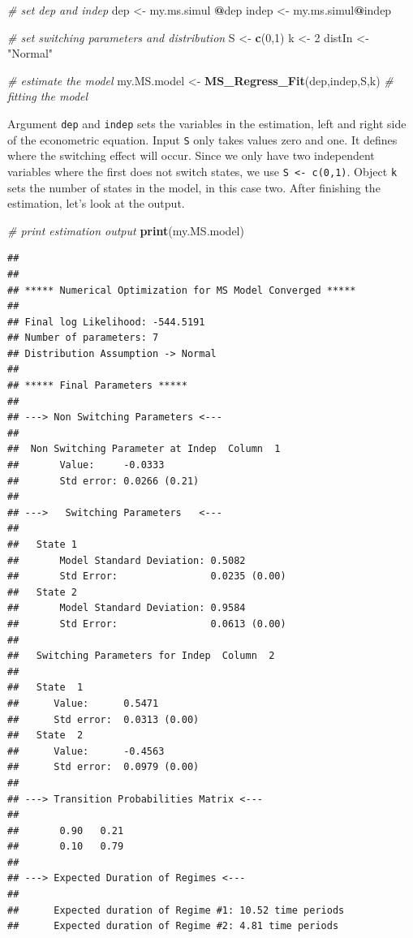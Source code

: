 \documentclass[11pt,]{book}
\newenvironment{Shaded}{\begin{snugshade}}{\end{snugshade}}
\newcommand{\KeywordTok}[1]{\textcolor[rgb]{0.27,0.27,0.27}{\textbf{#1}}}
\newcommand{\DecValTok}[1]{\textcolor[rgb]{0.06,0.06,0.06}{#1}}
\newcommand{\StringTok}[1]{\textcolor[rgb]{0.5,0.5,0.5}{#1}}
\newcommand{\CommentTok}[1]{\textcolor[rgb]{0.56,0.35,0.01}{\textit{#1}}}
\newcommand{\OperatorTok}[1]{\textcolor[rgb]{0.81,0.36,0.00}{\textbf{#1}}}
\newcommand{\NormalTok}[1]{#1}
\begin{document}
\begin{Shaded}
\begin{Highlighting}[]
\CommentTok{# set dep and indep }
\NormalTok{dep <-}\StringTok{ }\NormalTok{my.ms.simul }\OperatorTok{@}\NormalTok{dep}
\NormalTok{indep <-}\StringTok{ }\NormalTok{my.ms.simul}\OperatorTok{@}\NormalTok{indep}

\CommentTok{# set switching parameters and distribution}
\NormalTok{S <-}\StringTok{ }\KeywordTok{c}\NormalTok{(}\DecValTok{0}\NormalTok{,}\DecValTok{1}\NormalTok{) }
\NormalTok{k <-}\StringTok{ }\DecValTok{2}      
\NormalTok{distIn <-}\StringTok{ "Normal"} 

\CommentTok{# estimate the model}
\NormalTok{my.MS.model <-}\StringTok{ }\KeywordTok{MS_Regress_Fit}\NormalTok{(dep,indep,S,k)    }\CommentTok{# fitting the model}
\end{Highlighting}
\end{Shaded}

Argument \texttt{dep} and \texttt{indep} sets the variables in the
estimation, left and right side of the econometric equation. Input
\texttt{S} only takes values zero and one. It defines where the
switching effect will occur. Since we only have two independent
variables where the first does not switch states, we use
\texttt{S\ \textless{}-\ c(0,1)}. Object \texttt{k} sets the number of
states in the model, in this case two. After finishing the estimation,
let's look at the output.

\begin{Shaded}
\begin{Highlighting}[]
\CommentTok{# print estimation output}
\KeywordTok{print}\NormalTok{(my.MS.model)}
\end{Highlighting}
\end{Shaded}

\begin{verbatim}
## 
## 
## ***** Numerical Optimization for MS Model Converged *****
## 
## Final log Likelihood: -544.5191 
## Number of parameters: 7 
## Distribution Assumption -> Normal 
## 
## ***** Final Parameters *****
## 
## ---> Non Switching Parameters <---
## 
##  Non Switching Parameter at Indep  Column  1
##       Value:     -0.0333
##       Std error: 0.0266 (0.21)
## 
## --->   Switching Parameters   <---
## 
##   State 1
##       Model Standard Deviation: 0.5082
##       Std Error:                0.0235 (0.00)
##   State 2
##       Model Standard Deviation: 0.9584
##       Std Error:                0.0613 (0.00)
## 
##   Switching Parameters for Indep  Column  2 
## 
##   State  1
##      Value:      0.5471
##      Std error:  0.0313 (0.00)
##   State  2
##      Value:      -0.4563
##      Std error:  0.0979 (0.00)
## 
## ---> Transition Probabilities Matrix <---
## 
##       0.90   0.21   
##       0.10   0.79   
## 
## ---> Expected Duration of Regimes <---
## 
##      Expected duration of Regime #1: 10.52 time periods
##      Expected duration of Regime #2: 4.81 time periods
\end{verbatim}
\end{document}
